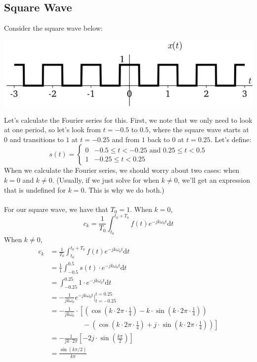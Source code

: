\documentclass[10pt]{article}
\begin{document}
\subsection*{Square Wave}
Consider the square wave below:
\begin{center}
    \includegraphics[scale=0.8]{W4_7.png}
\end{center}
Let's calculate the Fourier series for this.  First, we note that we only need to look at one period, so let's look from $t = -0.5$ to $0.5$, where the square wave starts at $0$ and transitions to $1$ at $t = -0.25$ and from $1$ back to $0$ at $t = 0.25$.  Let's define:
\[s(t) = \begin{cases} 0 & -0.5 \leq t < -0.25 \text{ and } 0.25 \leq t < 0.5 \\ 1 & -0.25 \leq t < 0.25\end{cases}\]
When we calculate the Fourier series, we should worry about two cases: when $k = 0$ and $k \neq 0$.  (Usually, if we just solve for when $k \neq 0$, we'll get an expression that is undefined for $k = 0$.  This is why we do both.)\\\\
For our square wave, we have that $T_0 = 1$.  When $k = 0$, 
\[c_k = \frac{1}{T_0} \int_{t_0}^{t_0 + T_0} f(t) e^{-jk\omega_0 t}\text{d}t\]
When $k \neq 0$,
\begin{align*}
    c_k &= \frac{1}{T_0} \int_{t_0}^{t_0 + T_0} f(t) e^{-jk\omega_0 t}\text{d}t\\
    &= \frac{1}{1} \int_{-0.5}^{0.5} s(t) \cdot e^{-jk\omega_0 t} \text{d}t\\
    &= \int_{-0.25}^{0.25} 1 \cdot e^{-jk\omega_0 t} \text{d}t\\
    &= -\frac{1}{jk\omega_0} e^{-jk\omega_0 t} \rvert_{t = -0.25}^{t = 0.25}\\
    &= -\frac{1}{jk\omega_0} \cdot \left[\left(\cos\left(k \cdot 2\pi \cdot \frac{1}{4}\right) - k \cdot \sin\left(k \cdot 2\pi \cdot \frac{1}{4}\right)\right)\right. \\
    &\hspace{2cm}- \left.\left(\cos\left( k \cdot 2\pi \cdot \frac{1}{4}\right) + j \cdot \sin\left(k \cdot 2\pi \cdot \frac{1}{4}\right)\right)\right]\\
    &= -\frac{1}{jk\cdot 2\pi} \left[ -2j \cdot \sin\left(\frac{k\pi}{2}\right)\right]\\
    &= \frac{\sin(k\pi / 2)}{k\pi}
\end{align*}
\end{document}
